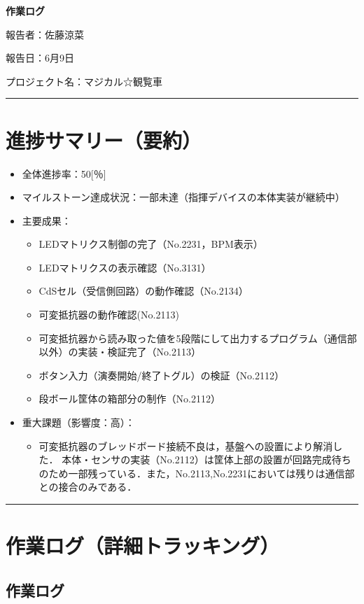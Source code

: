 \documentclass[uplatex,dvipdfmx,a4paper,11pt]{jsarticle}
\newcommand{\sectionrule}{\par\medskip\noindent\rule{\linewidth}{0.6pt}\par\medskip}
\begin{document}
{\LARGE\bfseries 作業ログ}\par\bigskip

報告者：佐藤涼菜

報告日：6月9日

プロジェクト名：マジカル☆観覧車

\sectionrule


\section{進捗サマリー（要約）}

\begin{itemize}
  \item 全体進捗率：50[％]
  \item マイルストーン達成状況：一部未達（指揮デバイスの本体実装が継続中）
  \item 主要成果：
    \begin{itemize}
      \item {LEDマトリクス制御の完了（No.2231，BPM表示）}
      \item {LEDマトリクスの表示確認（No.3131）}
      \item {CdSセル（受信側回路）の動作確認（No.2134）}
      \item {可変抵抗器の動作確認(No.2113)}
      \item {可変抵抗器から読み取った値を5段階にして出力するプログラム（通信部以外）の実装・検証完了（No.2113）}
      \item {ボタン入力（演奏開始/終了トグル）の検証（No.2112）}
      \item {段ボール筐体の箱部分の制作（No.2112）}
    \end{itemize}
  \item 重大課題（影響度：高）：
    \begin{itemize}
      \item {可変抵抗器のブレッドボード接続不良は，基盤への設置により解消した．
      本体・センサの実装（No.2112）は筐体上部の設置が回路完成待ちのため一部残っている．また，No.2113,No.2231においては残りは通信部との接合のみである．}
    \end{itemize}
\end{itemize}

\sectionrule


\section{作業ログ（詳細トラッキング）}

\subsection{作業ログ}
\end{document}
